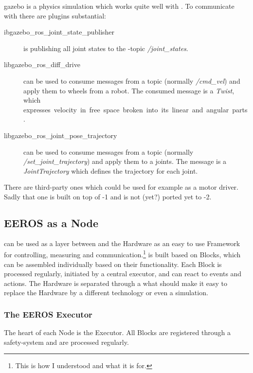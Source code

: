\Gls{gazebo} is a physics simulation which works quite well with .
To communicate with  there are plugins substantial:

\begin{description}
    \item[ibgazebo\_ros\_joint\_state\_publisher] is publishing all joint states to the -\Gls{topic} \textit{/joint\_states}.
    \item[libgazebo\_ros\_diff\_drive] can be used to consume messages from a topic (normally \textit{/cmd\_vel}) and apply them to wheels from a robot. The consumed message is a \textit{Twist}, which expresses velocity in free space broken into its linear and angular parts.
    \item[libgazebo\_ros\_joint\_pose\_trajectory] can be used to consume messages from a topic (normally \textit{/set\_joint\_trajectory}) and apply them to a joints. The message is a \textit{JointTrajectory} which defines the trajectory for each joint.
\end{description}

There are third-party ones which could be used for example as a motor driver.
Sadly that one is built on top of -1 and is not (yet?) ported yet to -2.


\subsection[EEROS]{EEROS as a Node} \label{sec:eeros-node}

 can be used as a layer between  and the Hardware as an easy to use Framework for controlling, measuring and communication.\footnote{This is how I understood  and what it is for.}
 is built based on Blocks, which can be assembled individually based on their functionality.
Each Block is processed regularly, initiated by a central executor, and can react to events and actions.
The Hardware is separated through a  what should make it easy to replace the Hardware by a different technology or even a simulation.


\subsubsection[EEROS Executor]{The EEROS Executor} \label{sec:eeros-executor}

The heart of each  Node is the Executor.
All Blocks are registered through a safety-system and are processed regularly.

